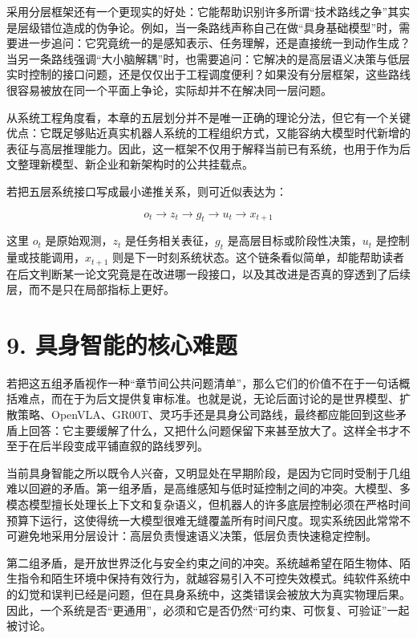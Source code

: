 采用分层框架还有一个更现实的好处：它能帮助识别许多所谓“技术路线之争”其实是层级错位造成的伪争论。例如，当一条路线声称自己在做“具身基础模型”时，需要进一步追问：它究竟统一的是感知表示、任务理解，还是直接统一到动作生成？当另一条路线强调“大小脑解耦”时，也需要追问：它解决的是高层语义决策与低层实时控制的接口问题，还是仅仅出于工程调度便利？如果没有分层框架，这些路线很容易被放在同一个平面上争论，实际却并不在解决同一层问题。

从系统工程角度看，本章的五层划分并不是唯一正确的理论分法，但它有一个关键优点：它既足够贴近真实机器人系统的工程组织方式，又能容纳大模型时代新增的表征与高层推理能力。因此，这一框架不仅用于解释当前已有系统，也用于作为后文整理新模型、新企业和新架构时的公共挂载点。

若把五层系统接口写成最小递推关系，则可近似表达为：

\begingroup
\footnotesize
\begin{equation*}
o_t \rightarrow z_t \rightarrow g_t \rightarrow u_t \rightarrow x_{t+1}
\end{equation*}
\endgroup

这里 \(o_t\) 是原始观测，\(z_t\) 是任务相关表征，\(g_t\) 是高层目标或阶段性决策，\(u_t\) 是控制量或技能调用，\(x_{t+1}\) 则是下一时刻系统状态。这个链条看似简单，却能帮助读者在后文判断某一论文究竟是在改进哪一段接口，以及其改进是否真的穿透到了后续层，而不是只在局部指标上更好。

\section*{9. 具身智能的核心难题}

若把这五组矛盾视作一种“章节间公共问题清单”，那么它们的价值不在于一句话概括难点，而在于为后文提供复审标准。也就是说，无论后面讨论的是世界模型、扩散策略、OpenVLA、GR00T、灵巧手还是具身公司路线，最终都应能回到这些矛盾上回答：它主要缓解了什么，又把什么问题保留下来甚至放大了。这样全书才不至于在后半段变成平铺直叙的路线罗列。

当前具身智能之所以既令人兴奋，又明显处在早期阶段，是因为它同时受制于几组难以回避的矛盾。第一组矛盾，是高维感知与低时延控制之间的冲突。大模型、多模态模型擅长处理长上下文和复杂语义，但机器人的许多底层控制必须在严格时间预算下运行，这使得统一大模型很难无缝覆盖所有时间尺度。现实系统因此常常不可避免地采用分层设计：高层负责慢速语义决策，低层负责快速稳定控制。

第二组矛盾，是开放世界泛化与安全约束之间的冲突。系统越希望在陌生物体、陌生指令和陌生环境中保持有效行为，就越容易引入不可控失效模式。纯软件系统中的幻觉和误判已经是问题，但在具身系统中，这类错误会被放大为真实物理后果。因此，一个系统是否“更通用”，必须和它是否仍然“可约束、可恢复、可验证”一起被讨论。

